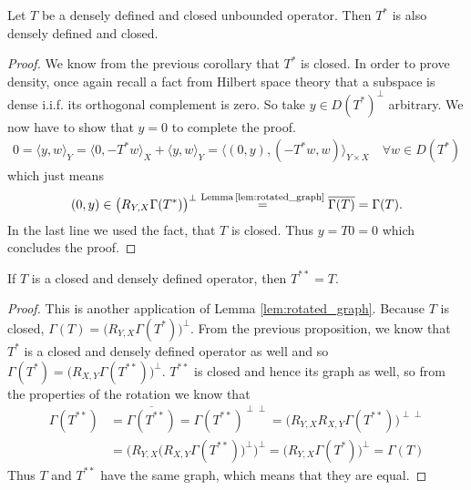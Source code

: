 \documentclass[../master_thesis.tex]{subfiles}
\begin{document}
\begin{proposition}\label{prop:adjoint_of_densely_defined_closed}
    Let $T$ be a densely defined and closed unbounded operator.
    Then $T^*$ is also densely defined and closed.
\end{proposition}
\begin{proof}
    We know from the previous corollary that $T^*$ is closed. 
    In order to prove density, once again recall a fact from Hilbert space
    theory that a subspace is dense i.i.f. its orthogonal complement 
    is zero. So take $y \in D(T^*)^\perp$ arbitrary. We now have to show that 
    $y=0$ to complete the proof.
    \begin{align*}
        0 = \langle y, w \rangle_Y 
        = \langle 0, -T^*w \rangle _X + \langle y, w \rangle _Y
        = \langle (0,y), (-T^*w,w) \rangle _{Y\times X} \quad \forall w \in D(T^*)
    \end{align*}
    which just means
    \begin{align*}
        (0,y) \in \big(R_{Y,X}\Gamma(T^*)\big)^\perp 
        \stackrel{\text{Lemma\,\ref{lem:rotated_graph}} }{=} \overline{\Gamma(T)}
        = \Gamma(T).
    \end{align*}
    In the last line we used the fact, that $T$ is closed. 
    Thus $y = T0 = 0$ which concludes the proof.
\end{proof}

\begin{proposition}\label{prop:T_starstar_equals_T}
    If $T$ is a closed and densely defined operator, 
    then $T^{**} = T$.
\end{proposition}
\begin{proof}
    This is another application of Lemma \ref{lem:rotated_graph}. 
    Because $T$ is closed, $\Gamma(T) = \big( R_{Y,X}\Gamma(T^*)\big)^\perp$. 
    From the previous proposition, we know that $T^*$ is a closed and 
    densely defined operator as well and so $\Gamma(T^*) = \big( R_{X,Y}\Gamma(T^{**})\big)^\perp$.
    $T^{**}$ is closed and hence its graph as well, so
    from the properties of the rotation we know that
    \begin{align*}
        \Gamma(T^{**}) 
        &= \overline{\Gamma(T^{**})} 
        = \Gamma(T^{**})^{\perp \perp}
        = \big( R_{Y,X} R_{X,Y}\Gamma(T^{**})   \big)^{\perp \perp}
        \\ &= \Big( R_{Y,X}\big(R_{X,Y}\Gamma(T^{**})\big)^{\perp} \Big)^\perp
        = \Big( R_{Y,X} \Gamma(T^*) \Big)^\perp
        = \Gamma(T)
    \end{align*}
    Thus $T$ and $T^{**}$ have the same graph, which means that they are equal.
\end{proof}
\end{document}
